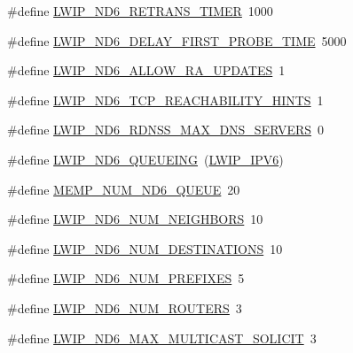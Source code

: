 \begin{DoxyCompactItemize}
\item 
\#define \hyperlink{group__lwip__opts__nd6_ga461abcbeef1d236d1f3201827dd28ad9}{L\+W\+I\+P\+\_\+\+N\+D6\+\_\+\+R\+E\+T\+R\+A\+N\+S\+\_\+\+T\+I\+M\+ER}~1000
\item 
\#define \hyperlink{group__lwip__opts__nd6_ga315bd6d4a9d185766dfc3253cd9d7715}{L\+W\+I\+P\+\_\+\+N\+D6\+\_\+\+D\+E\+L\+A\+Y\+\_\+\+F\+I\+R\+S\+T\+\_\+\+P\+R\+O\+B\+E\+\_\+\+T\+I\+ME}~5000
\item 
\#define \hyperlink{group__lwip__opts__nd6_gad35d10353ac7c7d2c8d4b83788cdc6d9}{L\+W\+I\+P\+\_\+\+N\+D6\+\_\+\+A\+L\+L\+O\+W\+\_\+\+R\+A\+\_\+\+U\+P\+D\+A\+T\+ES}~1
\item 
\#define \hyperlink{group__lwip__opts__nd6_ga9d7cb6fd447ef0f6726f565e2c7509c4}{L\+W\+I\+P\+\_\+\+N\+D6\+\_\+\+T\+C\+P\+\_\+\+R\+E\+A\+C\+H\+A\+B\+I\+L\+I\+T\+Y\+\_\+\+H\+I\+N\+TS}~1
\item 
\#define \hyperlink{group__lwip__opts__nd6_gaea4d829c0b52cc6cc28925eee89a7429}{L\+W\+I\+P\+\_\+\+N\+D6\+\_\+\+R\+D\+N\+S\+S\+\_\+\+M\+A\+X\+\_\+\+D\+N\+S\+\_\+\+S\+E\+R\+V\+E\+RS}~0
\item 
\#define \hyperlink{group__lwip__opts__nd6_ga0757a3c1b5d1563ad2d77228e1d8a60f}{L\+W\+I\+P\+\_\+\+N\+D6\+\_\+\+Q\+U\+E\+U\+E\+I\+NG}~(\hyperlink{openmote-cc2538_2lwip_2test_2fuzz_2lwipopts_8h_a872e3bb3fe2212156d66b18fccc9643f}{L\+W\+I\+P\+\_\+\+I\+P\+V6})
\item 
\#define \hyperlink{group__lwip__opts__nd6_gabfaf3d92d51e2a9d70c8360af2611fb2}{M\+E\+M\+P\+\_\+\+N\+U\+M\+\_\+\+N\+D6\+\_\+\+Q\+U\+E\+UE}~20
\item 
\#define \hyperlink{group__lwip__opts__nd6_gab2fe15bdb4e0a41f295eb5577b11ad16}{L\+W\+I\+P\+\_\+\+N\+D6\+\_\+\+N\+U\+M\+\_\+\+N\+E\+I\+G\+H\+B\+O\+RS}~10
\item 
\#define \hyperlink{group__lwip__opts__nd6_gacad118b1ae886e80137a1d4f0fb19672}{L\+W\+I\+P\+\_\+\+N\+D6\+\_\+\+N\+U\+M\+\_\+\+D\+E\+S\+T\+I\+N\+A\+T\+I\+O\+NS}~10
\item 
\#define \hyperlink{group__lwip__opts__nd6_gad9cc576b5951f1b5e1c2b0d0bb831d9a}{L\+W\+I\+P\+\_\+\+N\+D6\+\_\+\+N\+U\+M\+\_\+\+P\+R\+E\+F\+I\+X\+ES}~5
\item 
\#define \hyperlink{group__lwip__opts__nd6_ga75e81a96148f266c8fad8c0bcab2f36a}{L\+W\+I\+P\+\_\+\+N\+D6\+\_\+\+N\+U\+M\+\_\+\+R\+O\+U\+T\+E\+RS}~3
\item 
\#define \hyperlink{group__lwip__opts__nd6_ga980909018aed54adc10dd68be3572b30}{L\+W\+I\+P\+\_\+\+N\+D6\+\_\+\+M\+A\+X\+\_\+\+M\+U\+L\+T\+I\+C\+A\+S\+T\+\_\+\+S\+O\+L\+I\+C\+IT}~3

\end{DoxyCompactItemize}
